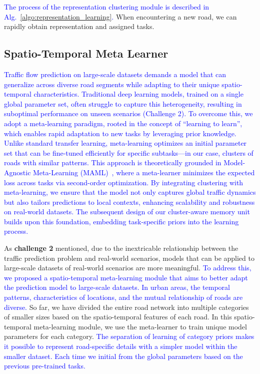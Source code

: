 \documentclass[lettersize,journal]{IEEEtran}
\begin{document}
\textcolor{blue}{The process of the representation clustering module is described in Alg.~\ref{algo:representation_learning}.} When encountering a new road, we can rapidly obtain representation and assigned tasks. 

\subsection{Spatio-Temporal Meta Learner}
\textcolor{blue}{Traffic flow prediction on large-scale datasets demands a model that can generalize across diverse road segments while adapting to their unique spatio-temporal characteristics. Traditional deep learning models, trained on a single global parameter set, often struggle to capture this heterogeneity, resulting in suboptimal performance on unseen scenarios (Challenge 2). To overcome this, we adopt a meta-learning paradigm, rooted in the concept of ``learning to learn'', which enables rapid adaptation to new tasks by leveraging prior knowledge. Unlike standard transfer learning, meta-learning optimizes an initial parameter set that can be fine-tuned efficiently for specific subtasks---in our case, clusters of roads with similar patterns. This approach is theoretically grounded in Model-Agnostic Meta-Learning (MAML)~\cite{DBLP:journals/corr/FinnAL17}, where a meta-learner minimizes the expected loss across tasks via second-order optimization. By integrating clustering with meta-learning, we ensure that the model not only captures global traffic dynamics but also tailors predictions to local contexts, enhancing scalability and robustness on real-world datasets. The subsequent design of our cluster-aware memory unit builds upon this foundation, embedding task-specific priors into the learning process.}

As \textbf{challenge 2} mentioned, due to the inextricable relationship between the traffic prediction problem and real-world scenarios, models that can be applied to large-scale datasets of real-world scenarios are more meaningful. \textcolor{blue}{To address this, we proposed a spatio-temporal meta-learning module that aims to better adapt the prediction model to large-scale datasets. In urban areas, the temporal patterns, characteristics of locations, and the mutual relationship of roads are diverse.} So far, we have divided the entire road network into multiple categories of smaller sizes based on the spatio-temporal features of each road. In this spatio-temporal meta-learning module, we use the meta-learner to train unique model parameters for each category. \textcolor{blue}{The separation of learning of category priors makes it possible to represent road-specific details with a simpler model within the smaller dataset. Each time we initial from the global parameters based on the previous pre-trained tasks.}
\end{document}
